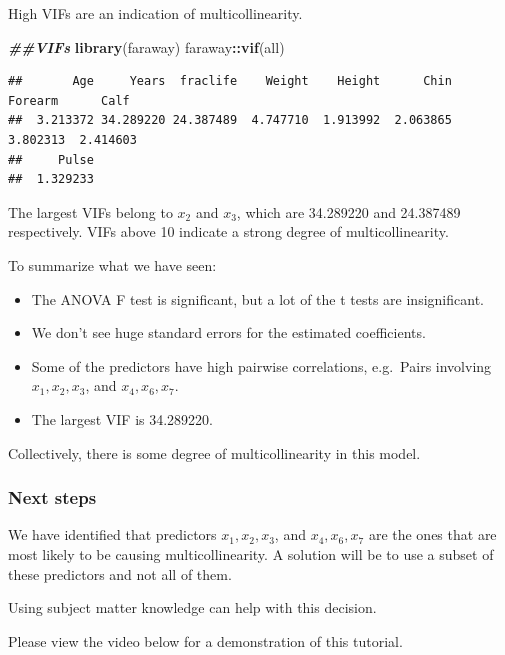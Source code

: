 \documentclass[
]{book}
\newenvironment{Shaded}{\begin{snugshade}}{\end{snugshade}}
\newcommand{\DocumentationTok}[1]{\textcolor[rgb]{0.56,0.35,0.01}{\textbf{\textit{#1}}}}
\newcommand{\FunctionTok}[1]{\textcolor[rgb]{0.13,0.29,0.53}{\textbf{#1}}}
\newcommand{\NormalTok}[1]{#1}
\newcommand{\SpecialCharTok}[1]{\textcolor[rgb]{0.81,0.36,0.00}{\textbf{#1}}}
\providecommand{\tightlist}{%
  \setlength{\itemsep}{0pt}\setlength{\parskip}{0pt}}
\begin{document}
High VIFs are an indication of multicollinearity.

\begin{Shaded}
\begin{Highlighting}[]
\DocumentationTok{\#\#VIFs}
\FunctionTok{library}\NormalTok{(faraway)}
\NormalTok{faraway}\SpecialCharTok{::}\FunctionTok{vif}\NormalTok{(all)}
\end{Highlighting}
\end{Shaded}

\begin{verbatim}
##       Age     Years  fraclife    Weight    Height      Chin   Forearm      Calf 
##  3.213372 34.289220 24.387489  4.747710  1.913992  2.063865  3.802313  2.414603 
##     Pulse 
##  1.329233
\end{verbatim}

The largest VIFs belong to \(x_2\) and \(x_3\), which are 34.289220 and 24.387489 respectively. VIFs above 10 indicate a strong degree of multicollinearity.

To summarize what we have seen:

\begin{itemize}
\tightlist
\item
  The ANOVA F test is significant, but a lot of the t tests are insignificant.
\item
  We don't see huge standard errors for the estimated coefficients.
\item
  Some of the predictors have high pairwise correlations, e.g.~Pairs involving \(x_1, x_2, x_3\), and \(x_4, x_6, x_7\).
\item
  The largest VIF is 34.289220.
\end{itemize}

Collectively, there is some degree of multicollinearity in this model.

\hypertarget{next-steps}{%
\subsubsection*{Next steps}\label{next-steps}}

We have identified that predictors \(x_1, x_2, x_3\), and \(x_4, x_6, x_7\) are the ones that are most likely to be causing multicollinearity. A solution will be to use a subset of these predictors and not all of them.

Using subject matter knowledge can help with this decision.

Please view the video below for a demonstration of this tutorial.
\end{document}
